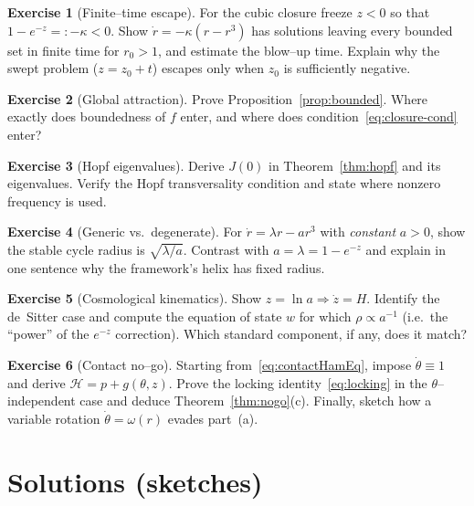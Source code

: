 \documentclass[11pt]{article}
\theoremstyle{plain}
\theoremstyle{definition}
\newtheorem{exercise}{Exercise}
\begin{document}
\begin{exercise}[Finite--time escape]
For the cubic closure freeze $z<0$ so that $1-e^{-z}=:-\kappa<0$. Show
$\dot r=-\kappa(r-r^3)$ has solutions leaving every bounded set in finite time
for $r_0>1$, and estimate the blow--up time. Explain why the swept problem
($z=z_0+t$) escapes only when $z_0$ is sufficiently negative.
\end{exercise}

\begin{exercise}[Global attraction]
Prove Proposition~\ref{prop:bounded}. Where exactly does boundedness of $f$
enter, and where does condition~\eqref{eq:closure-cond} enter?
\end{exercise}

\begin{exercise}[Hopf eigenvalues]
Derive $J(0)$ in Theorem~\ref{thm:hopf} and its eigenvalues. Verify the Hopf
transversality condition and state where nonzero frequency is used.
\end{exercise}

\begin{exercise}[Generic vs.\ degenerate]
For $\dot r=\lambda r-a r^3$ with \emph{constant} $a>0$, show the stable cycle
radius is $\sqrt{\lambda/a}$. Contrast with $a=\lambda=1-e^{-z}$ and explain in
one sentence why the framework's helix has fixed radius.
\end{exercise}

\begin{exercise}[Cosmological kinematics]
Show $z=\ln a\Rightarrow\dot z=H$. Identify the de~Sitter case and compute the
equation of state $w$ for which $\rho\propto a^{-1}$ (i.e.\ the ``power'' of the
$e^{-z}$ correction). Which standard component, if any, does it match?
\end{exercise}

\begin{exercise}[Contact no--go]
Starting from~\eqref{eq:contactHamEq}, impose $\dot\theta\equiv1$ and derive
$\mathcal H=p+g(\theta,z)$. Prove the locking identity~\eqref{eq:locking} in the
$\theta$--independent case and deduce Theorem~\ref{thm:nogo}(c). Finally,
sketch how a variable rotation $\dot\theta=\omega(r)$ evades part~(a).
\end{exercise}

\section{Solutions (sketches)}\label{sec:solutions}
\end{document}
